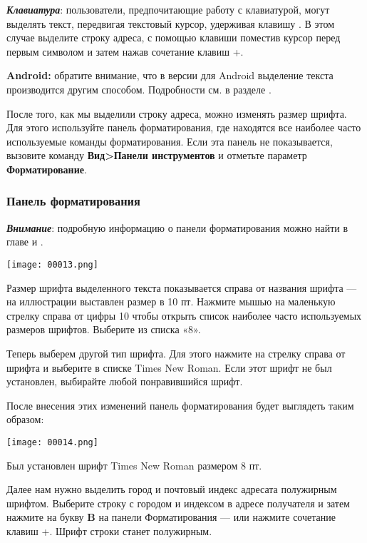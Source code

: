 ﻿\documentclass[a4paper,10pt]{article}
\begin{document}
\textbf{\textit{Клавиатура}}: пользователи, предпочитающие работу с клавиатурой, могут выделять текст, передвигая текстовый курсор, удерживая клавишу . В этом случае выделите строку адреса, с помощью клавиши  поместив курсор перед первым символом и затем нажав сочетание клавиш +\keys{\arrowkeydown}.

\begin{mdframed}[backgroundcolor=blue!10]
\textbf{Android:} обратите внимание, что в версии для Android выделение текста производится другим способом. Подробности см. в разделе .
\end{mdframed}

После того, как мы выделили строку адреса, можно изменять размер шрифта. Для этого используйте панель форматирования, где находятся все наиболее часто используемые команды форматирования. Если эта панель не показывается, вызовите команду \textbf{Вид>Панели инструментов} и отметьте параметр \textbf{Форматирование}.

\subsubsection{Панель форматирования}
\textbf{\textit{Внимание}}: подробную информацию о панели форматирования можно найти в главе  и .

\texttt{[image: 00013.png]}

Размер шрифта выделенного текста показывается справа от названия шрифта — на иллюстрации выставлен размер в 10 пт. Нажмите мышью на маленькую стрелку справа от цифры 10 чтобы открыть список наиболее часто используемых  размеров шрифтов. Выберите из списка «8».

Теперь выберем другой тип шрифта. Для этого нажмите на стрелку справа от шрифта и выберите в списке Times New Roman. Если этот шрифт не был установлен, выбирайте любой понравившийся шрифт.

После внесения этих изменений панель форматирования будет выглядеть таким образом:

\texttt{[image: 00014.png]}

Был установлен шрифт Times New Roman размером 8 пт.

Далее нам нужно выделить город и почтовый индекс адресата полужирным шрифтом. Выберите строку с городом и индексом в адресе получателя и затем нажмите на букву \textbf{B} на панели Форматирования — или нажмите сочетание клавиш +. Шрифт строки станет полужирным.
\end{document}
